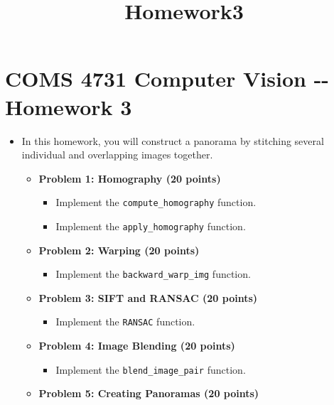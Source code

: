 \documentclass[11pt]{article}
\title{Homework3}
\providecommand{\tightlist}{%
      \setlength{\itemsep}{0pt}\setlength{\parskip}{0pt}}
\begin{document}
    
    
    \maketitle
    
    

    
    \section{COMS 4731 Computer Vision -\/- Homework
3}\label{coms-4731-computer-vision----homework-3}

\begin{itemize}
\item
  In this homework, you will construct a panorama by stitching several
  individual and overlapping images together.

  \begin{itemize}
  \tightlist
  \item
    \textbf{Problem 1: Homography (20 points)}

    \begin{itemize}
    \tightlist
    \item
      Implement the \texttt{compute\_homography} function.
    \item
      Implement the \texttt{apply\_homography} function.
    \end{itemize}
  \item
    \textbf{Problem 2: Warping (20 points)}

    \begin{itemize}
    \tightlist
    \item
      Implement the \texttt{backward\_warp\_img} function.
    \end{itemize}
  \item
    \textbf{Problem 3: SIFT and RANSAC (20 points)}

    \begin{itemize}
    \tightlist
    \item
      Implement the \texttt{RANSAC} function.
    \end{itemize}
  \item
    \textbf{Problem 4: Image Blending (20 points)}

    \begin{itemize}
    \tightlist
    \item
      Implement the \texttt{blend\_image\_pair} function.
    \end{itemize}
  \item
    \textbf{Problem 5: Creating Panoramas (20 points)}


\end{itemize}
\end{itemize}
\end{document}
